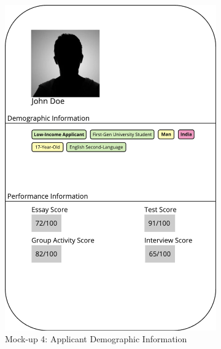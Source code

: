 \begin{figure}[htbp]
    \begin{subfigure}[b]{0.3\textwidth}
        \includegraphics[width=\textwidth]{figures/codesign/demographic.png}
        \caption{Mock-up 4: Applicant Demographic Information}
        \label{fig:demographic}
    \end{subfigure}
    \hfill
    \begin{subfigure}[b]{0.3\textwidth}

\end{subfigure}
\end{figure}
